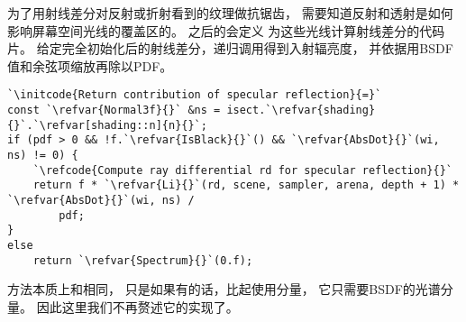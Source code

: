 为了用射线差分对反射或折射看到的纹理做抗锯齿，
需要知道反射和透射是如何影响屏幕空间光线的覆盖区的。
之后的会定义
为这些光线计算射线差分的代码片。
给定完全初始化后的射线差分，递归调用得到入射辐亮度，
并依据用BSDF值和余弦项缩放再除以PDF。
\begin{lstlisting}
`\initcode{Return contribution of specular reflection}{=}`
const `\refvar{Normal3f}{}` &ns = isect.`\refvar{shading}{}`.`\refvar[shading::n]{n}{}`;
if (pdf > 0 && !f.`\refvar{IsBlack}{}`() && `\refvar{AbsDot}{}`(wi, ns) != 0) {
    `\refcode{Compute ray differential rd for specular reflection}{}`
    return f * `\refvar{Li}{}`(rd, scene, sampler, arena, depth + 1) * `\refvar{AbsDot}{}`(wi, ns) /
        pdf;
}
else
    return `\refvar{Spectrum}{}`(0.f);
\end{lstlisting}

方法{}本质上和相同，
只是如果有的话，比起使用分量，
它只需要BSDF的光谱分量。
因此这里我们不再赘述它的实现了。